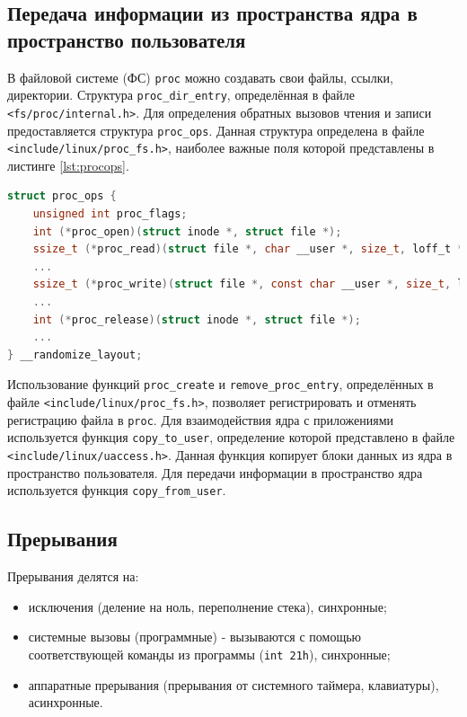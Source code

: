 \subsection{Передача информации из пространства ядра в пространство пользователя}

В файловой системе (ФС) \texttt{proc} можно создавать свои файлы, ссылки, директории. Структура \texttt{proc\_dir\_entry}, определённая в файле \texttt{<fs/proc/internal.h>}. Для определения обратных вызовов чтения и записи предоставляется структура \texttt{proc\_ops}. Данная структура определена в файле
\texttt{<include/linux/proc\_fs.h>}, наиболее важные поля которой представлены в листинге \ref{lst:procops}.

\begin{lstlisting}[label=lst:procops,caption=Структура proc\_ops, language=c]
struct proc_ops {
	unsigned int proc_flags;
	int	(*proc_open)(struct inode *, struct file *);
	ssize_t	(*proc_read)(struct file *, char __user *, size_t, loff_t *);
	...
	ssize_t	(*proc_write)(struct file *, const char __user *, size_t, loff_t *);
	...
	int	(*proc_release)(struct inode *, struct file *);
	...
} __randomize_layout;
\end{lstlisting}

Использование функций \texttt{proc\_create} и \texttt{remove\_proc\_entry}, определённых в файле \texttt{<include/linux/proc\_fs.h>}, позволяет регистрировать и отменять регистрацию файла в \texttt{proc}. Для взаимодействия ядра с приложениями используется функция \texttt{copy\_to\_user}, определение которой представлено в файле \texttt{<include/linux/uaccess.h>}. Данная функция копирует блоки данных из ядра в пространство пользователя. Для передачи информации в пространство ядра используется функция \texttt{copy\_from\_user}.

\subsection{Прерывания}

Прерывания делятся на:
\begin{itemize}
	\item исключения (деление на ноль, переполнение стека), синхронные;
	\item системные вызовы (программные) - вызываются с помощью соответствующей команды из программы (\texttt{int 21h}), синхронные;
	\item аппаратные прерывания (прерывания от системного таймера, клавиатуры), асинхронные. 
\end{itemize}

